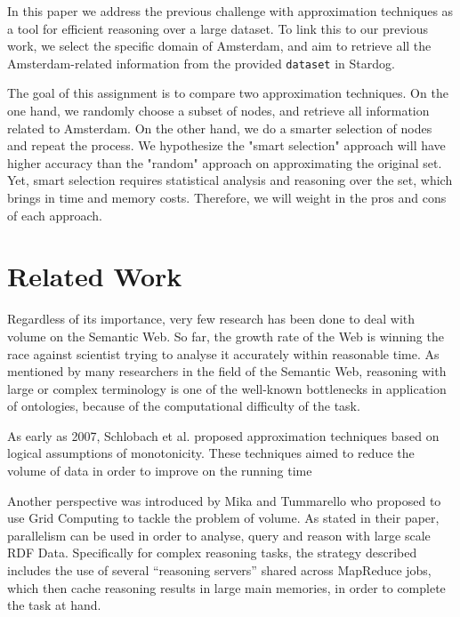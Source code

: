 \documentclass[runningheads,a4paper]{../../StyleFiles/llncs}
\begin{document}
In this paper we address the previous challenge with approximation techniques as a tool for efficient reasoning over a large dataset. To link this to our previous work, we select the specific domain of Amsterdam, and aim to retrieve all the Amsterdam-related information from the provided \texttt{dataset} in Stardog.  

The goal of this assignment is to compare two approximation techniques. On the one hand, we randomly choose a subset of nodes, and retrieve all information related to Amsterdam. On the other hand, we do a smarter selection of nodes and repeat the process. We hypothesize the "smart selection" approach will have higher accuracy than the "random" approach on approximating the original set. Yet, smart selection requires statistical analysis and reasoning over the set, which brings in time and memory costs. Therefore, we will weight in the pros and cons of each approach.

\section{Related Work}
Regardless of its importance, very few research has been done to deal with volume on the Semantic Web. So far, the growth rate of the Web is winning the race against scientist trying to analyse it accurately within reasonable time. As mentioned by many researchers in the field of the Semantic Web, reasoning with large or complex terminology is one of the well-known bottlenecks in application of ontologies, because of the computational difficulty of the task.

As early as 2007, Schlobach et al. proposed approximation techniques based on logical assumptions of monotonicity. These techniques aimed to reduce the volume of data in order to improve on the running time \cite{schlobach2007anytime}

Another perspective was introduced by Mika and Tummarello \cite{mika2008web} who proposed to use Grid Computing to tackle the problem of volume. As stated in their paper, parallelism can be used in order to analyse, query and reason with large scale RDF Data. Specifically for complex reasoning tasks, the strategy described includes the use of several “reasoning servers” shared across MapReduce jobs, which then cache reasoning results in large main memories, in order to complete the task at hand.

\end{document}
